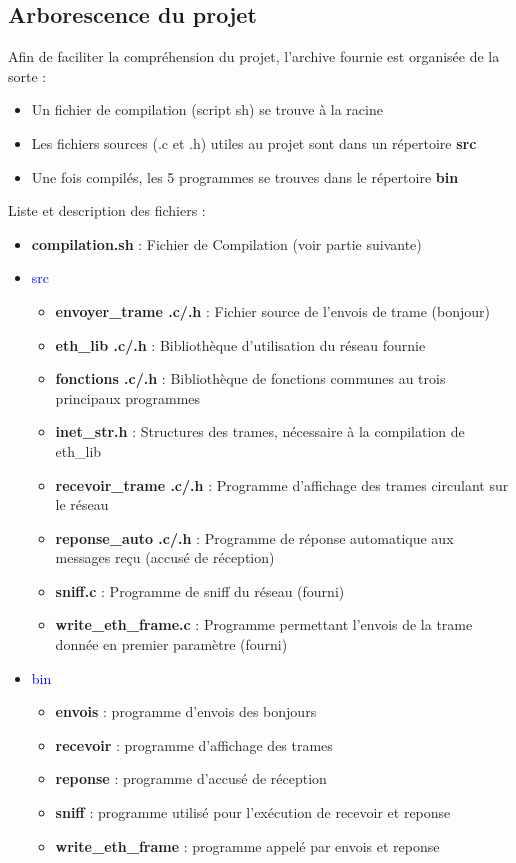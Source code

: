 \documentclass[a4paper,11pt]{article}
\begin{document}
	\subsection{Arborescence du projet}
	Afin de faciliter la compréhension du projet, l'archive fournie est organisée de la sorte :
	\begin{itemize}
	\item Un fichier de compilation (script sh) se trouve à la racine
	\item Les fichiers sources (.c et .h) utiles au projet sont dans un répertoire \textbf{src}
	\item Une fois compilés, les 5 programmes se trouves dans le répertoire \textbf{bin}
	\end{itemize}
		\renewcommand{\labelitemii}{+}
	Liste et description des fichiers :
	\begin{itemize}
	\item \textbf{compilation.sh} : Fichier de Compilation (voir partie suivante)
	\item \textcolor{blue}{src}
		\begin{itemize}
		\item \textbf{envoyer\_trame .c/.h} : Fichier source de l'envois de trame (bonjour)
		\item \textbf{eth\_lib .c/.h} : Bibliothèque d'utilisation du réseau fournie
		\item \textbf{fonctions .c/.h} : Bibliothèque de fonctions communes au trois principaux programmes
		\item \textbf{inet\_str.h} : Structures des trames, nécessaire à la compilation de eth\_lib
		\item \textbf{recevoir\_trame .c/.h} : Programme d'affichage des trames circulant sur le réseau
		\item \textbf{reponse\_auto .c/.h} : Programme de réponse automatique aux messages reçu (accusé de réception)
		\item \textbf{sniff.c} : Programme de sniff du réseau (fourni)
		\item \textbf{write\_eth\_frame.c} : Programme permettant l'envois de la trame donnée en premier paramètre (fourni)
		\end{itemize}
	\item \textcolor{blue}{bin}
		\begin{itemize}
		\item \textbf{envois} : programme d'envois des bonjours
		\item \textbf{recevoir} : programme d'affichage des trames
		\item \textbf{reponse} : programme d'accusé de réception
		\item \textbf{sniff} : programme utilisé pour l'exécution de recevoir et reponse
		\item \textbf{write\_eth\_frame} : programme appelé par envois et reponse
		\end{itemize}
	\end{itemize}
\end{document}
